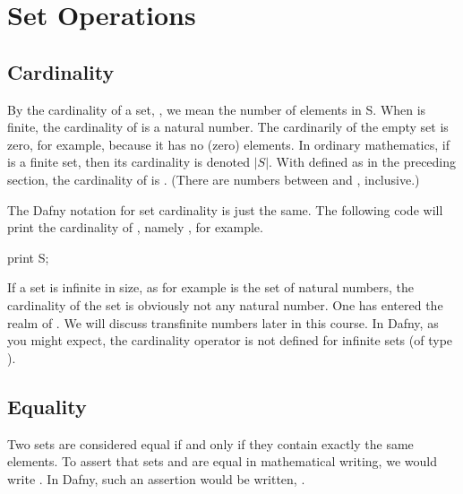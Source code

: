 \documentclass[letterpaper,10pt,english]{sphinxmanual}
\begin{document}
\section{Set Operations}
\label{\detokenize{07-set-theory:set-operations}}

\subsection{Cardinality}
\label{\detokenize{07-set-theory:cardinality}}
By the cardinality of a set, , we mean the number of elements
in S. When  is finite, the cardinality of  is a natural number.
The cardinarily of the empty set is zero, for example, because it has
no (zero) elements. In ordinary mathematics, if  is a finite set,
then its cardinality is denoted \(|S|\). With  defined as in
the preceding section, the cardinality of  is . (There are
 numbers between  and , inclusive.)

The Dafny notation for set cardinality is just the same. The following
code will print the cardinality of , namely , for example.

\begin{sphinxVerbatim}[commandchars=\\\{\}]
print \textbar{}S\textbar{};
\end{sphinxVerbatim}

If a set is infinite in size, as for example is the set of natural
numbers, the cardinality of the set is obviously not any natural
number. One has entered the realm of . We will
discuss transfinite numbers later in this course. In Dafny, as you
might expect, the cardinality operator is not defined for infinite
sets (of type ).


\subsection{Equality}
\label{\detokenize{07-set-theory:equality}}
Two sets are considered equal if and only if they contain exactly
the same elements. To assert that sets  and  are equal in
mathematical writing, we would write . In Dafny, such an
assertion would be written, .
\end{document}

